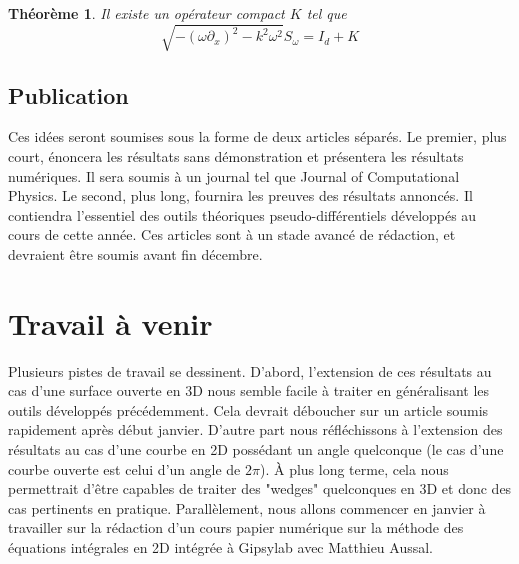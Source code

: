 \documentclass[utf8]{article}
\newtheorem{The}{Théorème}
\begin{document}
	\begin{The}
		Il existe un opérateur compact $K$ tel que
		\[\sqrt{-(\omega \partial_x)^2 - k^2 \omega^2} S_\omega = I_d + K\]
	\end{The}
	
	\subsection{Publication}
	
	Ces idées seront soumises sous la forme de deux articles séparés. Le premier, plus court, énoncera les résultats sans démonstration et présentera les résultats numériques. Il sera soumis à un journal tel que Journal of Computational Physics. Le second, plus long, fournira les preuves des résultats annoncés. Il contiendra l'essentiel des outils théoriques pseudo-différentiels développés au cours de cette année. Ces articles sont à un stade avancé de rédaction, et devraient être soumis avant fin décembre. 
	
	\section{Travail à venir}
	
	Plusieurs pistes de travail se dessinent. D'abord, l'extension de ces résultats au cas d'une surface ouverte en 3D nous semble facile à traiter en généralisant les outils développés précédemment. Cela devrait déboucher sur un article soumis rapidement après début janvier. D'autre part nous réfléchissons à l'extension des résultats au cas d'une courbe en 2D possédant un angle quelconque (le cas d'une courbe ouverte est celui d'un angle de $2\pi$). À plus long terme, cela nous permettrait d'être capables de traiter des "wedges" quelconques en 3D et donc des cas pertinents en pratique. Parallèlement, nous allons commencer en janvier à travailler sur la rédaction d'un cours papier numérique sur la méthode des équations intégrales en 2D intégrée à Gipsylab avec Matthieu Aussal. 
	
	
	
	
\end{document}
